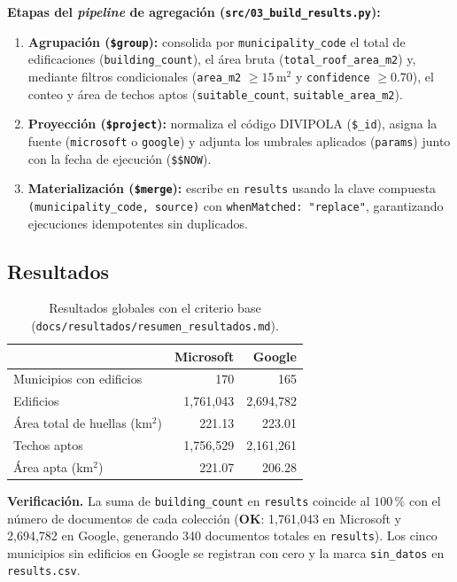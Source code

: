 \documentclass[12pt, letterpaper]{article}
\begin{document}
\textbf{Etapas del \emph{pipeline} de agregación (\texttt{src/03\_build\_results.py}):}
\begin{enumerate}
  \item \textbf{Agrupación (\texttt{\$group}):} consolida por \texttt{municipality\_code} el total de edificaciones (\texttt{building\_count}), el área bruta (\texttt{total\_roof\_area\_m2}) y, mediante filtros condicionales (\texttt{area\_m2} $\ge 15$\,m$^2$ y \texttt{confidence} $\ge 0.70$), el conteo y área de techos aptos (\texttt{suitable\_count}, \texttt{suitable\_area\_m2}).
  \item \textbf{Proyección (\texttt{\$project}):} normaliza el código DIVIPOLA (\texttt{\$\_id}), asigna la fuente (\texttt{microsoft} o \texttt{google}) y adjunta los umbrales aplicados (\texttt{params}) junto con la fecha de ejecución (\texttt{\$\$NOW}).
  \item \textbf{Materialización (\texttt{\$merge}):} escribe en \texttt{results} usando la clave compuesta \texttt{(municipality\_code, source)} con \texttt{whenMatched: "replace"}, garantizando ejecuciones idempotentes sin duplicados.
\end{enumerate}

\subsection{Resultados}
\begin{table}[H]
\centering
\small
{}
\begin{tabularx}{\textwidth}{X r r}
\toprule
 & \textbf{Microsoft} & \textbf{Google} \\
\midrule
Municipios con edificios & 170 & 165 \\
Edificios & 1{,}761{,}043 & 2{,}694{,}782 \\
Área total de huellas (km$^2$) & 221.13 & 223.01 \\
Techos aptos & 1{,}756{,}529 & 2{,}161{,}261 \\
Área apta (km$^2$) & 221.07 & 206.28 \\
\bottomrule
\end{tabularx}
\caption{Resultados globales con el criterio base (\texttt{docs/resultados/resumen\_resultados.md}).}
\label{tab:resultados}
\end{table}

\textbf{Verificación.} La suma de \texttt{building\_count} en \texttt{results} coincide al $100\,\%$ con el número de documentos de cada colección (\textbf{OK}: 1{,}761{,}043 en Microsoft y 2{,}694{,}782 en Google, generando 340 documentos totales en \texttt{results}). Los cinco municipios sin edificios en Google se registran con cero y la marca \texttt{sin\_datos} en \texttt{results.csv}.
\end{document}
